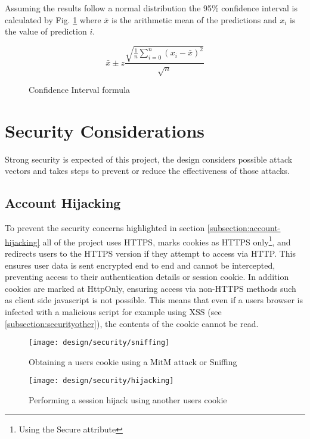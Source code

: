 Assuming the results follow a normal distribution the 95\% confidence interval is calculated by Fig. \ref{fig:confidencelevel} where $\bar{x}$ is the arithmetic mean of the predictions and $x_i$ is the value of prediction $i$.

\begin{figure}[h]
    \centering
    \[
        \bar{x} \pm z \frac{
                        \sqrt{
                            \frac{1}{n}
                            \sum\limits_{i=0}^{n}{(x_i - \bar{x})^2}
                        }
                       }{\sqrt{n}}
    \]
    \caption{Confidence Interval formula}
    \label{fig:confidencelevel}
\end{figure}

\section{Security Considerations} \label{section:security}
Strong security is expected of this project, the design considers possible attack vectors and takes steps to prevent or reduce the effectiveness of those attacks.

\subsection{Account Hijacking}
To prevent the security concerns highlighted in section \ref{subsection:account-hijacking} all of the project uses HTTPS, marks cookies as HTTPS only\footnote{Using the Secure attribute}, and redirects users to the HTTPS version if they attempt to access via HTTP. This ensures user data is sent encrypted end to end and cannot be intercepted, preventing access to their authentication details or session cookie.
%
In addition cookies are marked at HttpOnly, ensuring access via non-HTTPS methods such as client side javascript is not possible. This means that even if a users browser is infected with a malicious script for example using XSS (see \ref{subsection:securityother}), the contents of the cookie cannot be read.

\begin{figure}[h]
    \centering
    \texttt{[image: design/security/sniffing]}
    \caption[Obtaining a users cookie using a MitM attack or sniffing]{Obtaining a users cookie using a MitM attack or Sniffing \parencite{owasp2011sessionhihacking}}
    \label{fig:securitysniffing}
\end{figure}

\begin{figure}[h]
    \centering
    \texttt{[image: design/security/hijacking]}
    \caption{Performing a session hijack using another users cookie \parencite{owasp2011sessionhihacking}}
    \label{fig:securityhijacking}
\end{figure}

